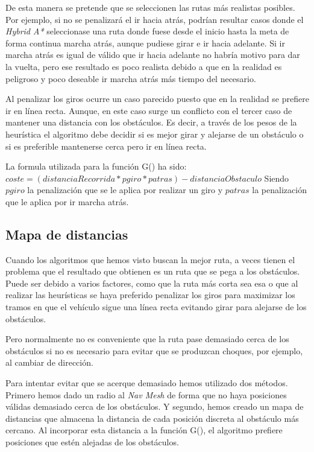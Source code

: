 De esta manera se pretende que se seleccionen las rutas más realistas posibles. Por ejemplo, si no se penalizará el ir hacia atrás, podrían resultar casos donde el \textit{Hybrid A*} seleccionase una ruta donde fuese desde el inicio hasta la meta de forma continua marcha atrás, aunque pudiese girar e ir hacia adelante. Si ir marcha atrás es igual de válido que ir hacia adelante no habría motivo para dar la vuelta, pero ese resultado es poco realista debido a que en la realidad es peligroso y poco deseable ir marcha atrás más tiempo del necesario.

Al penalizar los giros ocurre un caso parecido puesto que en la realidad se prefiere ir en línea recta. Aunque, en este caso surge un conflicto con el tercer caso de mantener una distancia con los obstáculos. Es decir, a través de los pesos de la heurística el algoritmo debe decidir si es mejor girar y alejarse de un obstáculo o si es preferible mantenerse cerca pero ir en línea recta.

La formula utilizada para la función G() ha sido:
$coste = (distanciaRecorrida * pgiro * patras) - distanciaObstaculo$
Siendo $pgiro$ la penalización que se le aplica por realizar un giro y $patras$ la penalización que le aplica por ir marcha atrás.

\subsection{Mapa de distancias}
Cuando los algoritmos que hemos visto buscan la mejor ruta, a veces tienen el problema que el resultado que obtienen es un ruta que se pega a los obstáculos. Puede ser debido a varios factores, como que la ruta más corta sea esa o que al realizar las heurísticas se haya preferido penalizar los giros para maximizar los tramos en que el vehículo sigue una línea recta evitando girar para alejarse de los obstáculos.

Pero normalmente no es conveniente que la ruta pase demasiado cerca de los obstáculos si no es necesario para evitar que se produzcan choques, por ejemplo, al cambiar de dirección.

Para intentar evitar que se acerque demasiado hemos utilizado dos métodos. Primero hemos dado un radio al \textit{Nav Mesh} de forma que no haya posiciones válidas demasiado cerca de los obstáculos. Y segundo, hemos creado un mapa de distancias que almacena la distancia de cada posición discreta al obstáculo más cercano. Al incorporar esta distancia a la función G(), el algoritmo prefiere posiciones que estén alejadas de los obstáculos.


